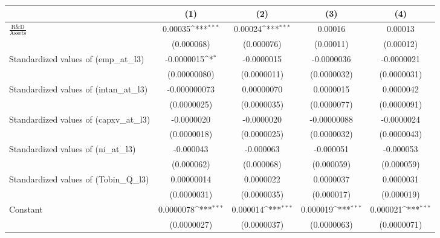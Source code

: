 {
\def\sym#1{\ifmmode^{#1}\else\(^{#1}\)\fi}
\begin{tabular}{l*{4}{c}}
\toprule
                    &\multicolumn{1}{c}{(1)}         &\multicolumn{1}{c}{(2)}         &\multicolumn{1}{c}{(3)}         &\multicolumn{1}{c}{(4)}         \\
\midrule
$\frac{\textrm{R\&D}}{\textrm{Assets}}$&     0.00035\sym{***}&     0.00024\sym{***}&     0.00016         &     0.00013         \\
                    &  (0.000068)         &  (0.000076)         &   (0.00011)         &   (0.00012)         \\
\addlinespace
Standardized values of (emp\_at\_l3)     &  -0.0000015\sym{*}  &  -0.0000015         &  -0.0000036         &  -0.0000021         \\
                    &(0.00000080)         & (0.0000011)         & (0.0000032)         & (0.0000031)         \\
\addlinespace
Standardized values of (intan\_at\_l3)     &-0.000000073         &  0.00000070         &   0.0000015         &   0.0000042         \\
                    & (0.0000025)         & (0.0000035)         & (0.0000077)         & (0.0000091)         \\
\addlinespace
Standardized values of (capxv\_at\_l3)     &  -0.0000020         &  -0.0000020         & -0.00000088         &  -0.0000024         \\
                    & (0.0000018)         & (0.0000025)         & (0.0000032)         & (0.0000043)         \\
\addlinespace
Standardized values of (ni\_at\_l3)     &   -0.000043         &   -0.000063         &   -0.000051         &   -0.000053         \\
                    &  (0.000062)         &  (0.000068)         &  (0.000059)         &  (0.000059)         \\
\addlinespace
Standardized values of (Tobin\_Q\_l3)     &  0.00000014         &   0.0000022         &   0.0000037         &   0.0000031         \\
                    & (0.0000031)         & (0.0000035)         &  (0.000017)         &  (0.000019)         \\
\addlinespace
Constant            &   0.0000078\sym{***}&    0.000014\sym{***}&    0.000019\sym{***}&    0.000021\sym{***}\\
                    & (0.0000027)         & (0.0000037)         & (0.0000063)         & (0.0000071)         \\

\end{tabular}}

